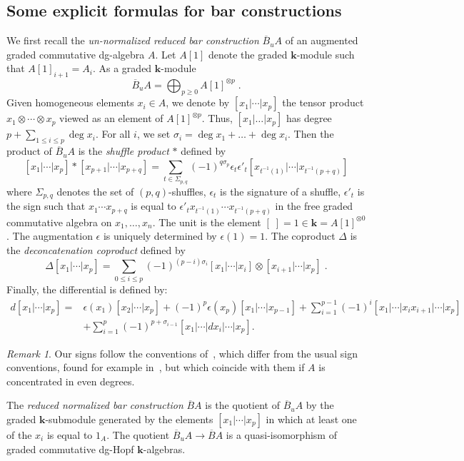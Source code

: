 \documentclass{amsart}
\theoremstyle{definition}
\theoremstyle{remark}
\newtheorem{remark}[formula]{Remark}
\renewcommand{\ge}{\geqslant}
\renewcommand{\le}{\leqslant}
\def\k{\mathbf{k}}
\begin{document}
\subsection{Some explicit formulas for bar constructions}
We first recall the \emph{un-normalized reduced bar construction} $\overline{B}_u A$ of an augmented graded commutative dg-algebra $A$. Let $A[1]$ denote the graded $\k$-module such that $A[1]_{i+1}=A_i$. As a graded $\k$-module 
$$\overline{B}_u A=\bigoplus_{p\ge 0} A[1]^{\otimes p}\;.$$
Given homogeneous elements $x_i\in A$, we denote by $[x_1|\cdots|x_p]$ the tensor product $x_1\otimes\cdots\otimes x_p$ viewed as an element of $A[1]^{\otimes p}$. Thus, $[x_1|\dots|x_p]$ has degree $p+\sum_{1\le i\le p}\deg x_i$. For all $i$, we set $\sigma_i=\deg x_1+\dots+\deg x_i$.
Then the product of $\overline{B}_u A$ is the \emph{shuffle product} $*$ defined by 
\[
[x_1|\cdots|x_p]*[x_{p+1}|\cdots|x_{p+q}]=\sum_{t\in \Sigma_{p,q}} (-1)^{q\sigma_p}\epsilon_t\epsilon'_t [x_{t^{-1}(1)}|\cdots|x_{t^{-1}(p+q)}]\]
where $\Sigma_{p,q}$ denotes the set of $(p,q)$-shuffles, $\epsilon_t$ is the signature of a shuffle, $\epsilon'_t$ is the sign such that $x_1\cdots x_{p+q}$ is equal to $ \epsilon'_t x_{t^{-1}(1)}\cdots x_{t^{-1}(p+q)}$ in the free graded commutative algebra on $x_1,\dots,x_n$. The unit is the element $[\;]=1\in\k=A[1]^{\otimes 0}$. The augmentation $\epsilon$ is uniquely determined by $\epsilon(1)=1$. The coproduct $\Delta$ is the \emph{deconcatenation coproduct} defined by
$$\Delta[x_1|\cdots|x_p]=\sum_{0\le i\le p}(-1)^{(p-i)\sigma_i}[x_1|\cdots|x_i]\otimes [x_{i+1}|\cdots|x_p]\;.$$
Finally, the differential is defined by:
\begin{align*}
	d[x_1|\cdots|x_p]=& 
	\epsilon(x_1)[x_2|\cdots|x_p] + (-1)^{p}\epsilon(x_p)[x_1|\cdots|x_{p-1}]
	+\sum_{i=1}^{p-1}(-1)^i[x_1|\cdots|x_ix_{i+1}|\cdots |x_p]\\
	&+\sum_{i=1}^p (-1)^{p+\sigma_{i-1}}[x_1|\cdots|dx_i|\cdots|x_p].
\end{align*}

\begin{remark}\label{rem:signs}
	Our signs follow the conventions of~\cite{gu-ma-74}, which differ from the usual sign conventions, found for example in~\cite{ml-63}, but which coincide with them if $A$ is concentrated in even degrees. 
\end{remark}

The \emph{reduced normalized bar construction} $\overline{B}A$ is the quotient of $\overline{B}_uA$ by the graded $\k$-submodule generated by the elements $[x_1|\cdots|x_p]$ in which at least one of the $x_i$ is equal to $1_A$. The quotient $\overline{B}_uA\to \overline{B}A$ is a quasi-isomorphism of graded commutative dg-Hopf $\k$-algebras.
\end{document}
